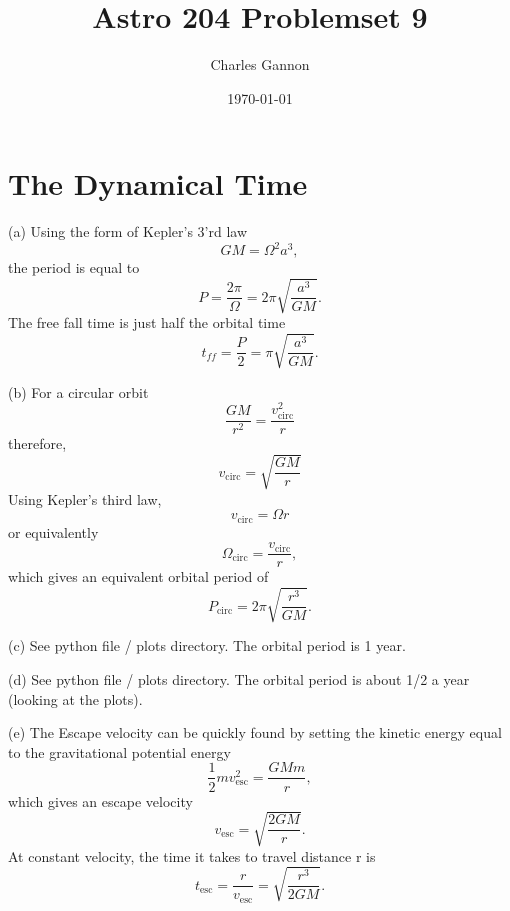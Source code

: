 \documentclass[11pt]{article}
\author{Charles Gannon}
\date{\today}
\title{Astro 204 Problemset 9}
\begin{document}
\maketitle
\tableofcontents

\section{The Dynamical Time}
\label{sec:orgf3da453}
(a) Using the form of Kepler's 3'rd law
\begin{equation}
 G M = \Omega^2 a^3,
\end{equation}
the period is equal to
\begin{equation}
 P = \frac{2 \pi}{\Omega} = 2 \pi \sqrt{\frac{a^3}{GM}}.
\end{equation}
The free fall time is just half the orbital time
\begin{equation}
 t_{ff} = \frac{P}{2} =  \pi \sqrt{ \frac{a^3}{GM} }.
\end{equation}

(b) For a circular orbit
\begin{equation}
 \frac{G M }{r^2} = \frac{v_{\text{circ}}^2}{r}
\end{equation}
therefore,
\begin{equation}
 v_{\text{circ}} = \sqrt{\frac{GM}{r}}
\end{equation}
Using Kepler's third law,
\begin{equation}
  v_{\text{circ}} = \Omega r
\end{equation}
or equivalently
\begin{equation}
 \Omega_{\text{circ}} = \frac{v_{\text{circ}}}{r},
\end{equation}
which gives an equivalent orbital period of
\begin{equation}
 P_{\text{circ}} = 2 \pi \sqrt{\frac{r^3}{G M}}.
\end{equation}


(c) See python file / plots directory. The orbital period is 1 year.



(d) See python file / plots directory. The orbital period is about 1/2 a year (looking at the plots).



(e) The Escape velocity can be quickly found by setting the kinetic energy equal to the gravitational potential energy
\begin{equation}
 \frac{1}{2} m v_{\text{esc}}^2 = \frac{G M m}{r},
\end{equation}
which gives an escape velocity
\begin{equation}
 v_{\text{esc}} = \sqrt{\frac{2 G M}{r}}.
\end{equation}
At constant velocity, the time it takes to travel distance r  is
\begin{equation}
 t_{\text{esc}} = \frac{r}{v_{\text{esc}}} = \sqrt{\frac{r^3}{2 G M}}.
\end{equation}
\end{document}
